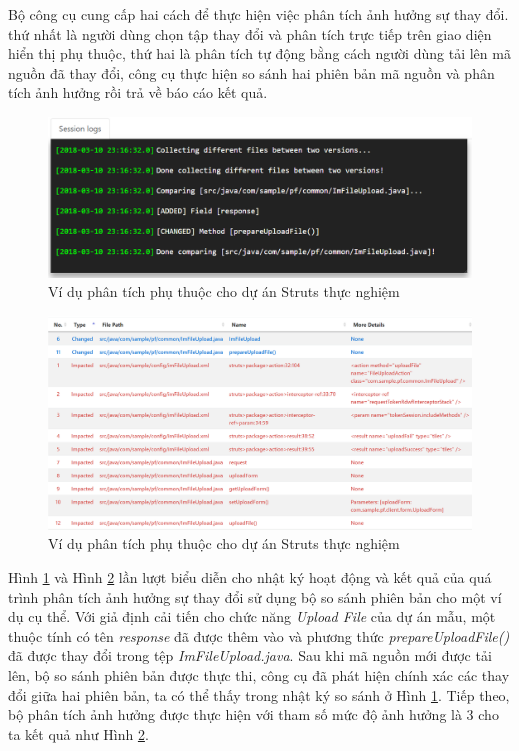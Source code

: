 \documentclass[12pt]{report}
\begin{document}
Bộ công cụ cung cấp hai cách để thực hiện việc phân tích ảnh hưởng sự thay đổi. thứ nhất là người dùng chọn tập thay đổi và phân tích trực tiếp trên giao diện hiển thị phụ thuộc, thứ hai là phân tích tự động bằng cách người dùng tải lên mã nguồn đã thay đổi, công cụ thực hiện so sánh hai phiên bản mã nguồn và phân tích ảnh hưởng rồi trả về báo cáo kết quả.

\begin{figure}[h]
	\centering
	\includegraphics[width=0.8\linewidth]{images/sample-vitm-1}
	\caption{Ví dụ phân tích phụ thuộc cho dự án Struts thực nghiệm}
	\label{fig:sample-vitm-1}
\end{figure}

\begin{figure}[h]
	\centering
	\includegraphics[width=0.9\linewidth]{images/sample-vitm-2}
	\caption{Ví dụ phân tích phụ thuộc cho dự án Struts thực nghiệm}
	\label{fig:sample-vitm-2}
\end{figure}

Hình \ref{fig:sample-vitm-1} và Hình \ref{fig:sample-vitm-2} lần lượt biểu diễn cho nhật ký hoạt động và kết quả của quá trình phân tích ảnh hưởng sự thay đổi sử dụng bộ so sánh phiên bản cho một ví dụ cụ thể. Với giả định cải tiến cho chức năng \textit{Upload File} của dự án mẫu, một thuộc tính có tên \textit{response} đã được thêm vào và phương thức \textit{prepareUploadFile()} đã được thay đổi trong tệp \textit{ImFileUpload.java}. Sau khi mã nguồn mới được tải lên, bộ so sánh phiên bản được thực thi, công cụ đã phát hiện chính xác các thay đổi giữa hai phiên bản, ta có thể thấy trong nhật ký so sánh ở Hình \ref{fig:sample-vitm-1}. Tiếp theo, bộ phân tích ảnh hưởng được thực hiện với tham số mức độ ảnh hưởng là 3 cho ta kết quả như Hình \ref{fig:sample-vitm-2}.
\end{document}
